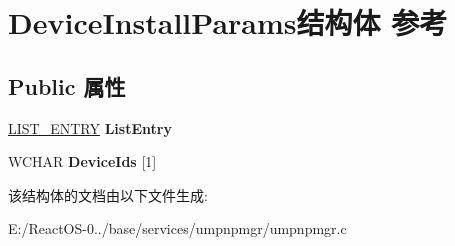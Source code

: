 \hypertarget{struct_device_install_params}{}\section{Device\+Install\+Params结构体 参考}
\label{struct_device_install_params}
\subsection*{Public 属性}
\begin{DoxyCompactItemize}
\item 
\mbox{\label{struct_device_install_params_a2e0cb8e1de7d3b516c00de3889af8368}} 
\hyperlink{struct___l_i_s_t___e_n_t_r_y}{L\+I\+S\+T\+\_\+\+E\+N\+T\+RY} {\bfseries List\+Entry}
\item 
\mbox{\label{struct_device_install_params_a8a22712b20970db35d51d211f3c3bcca}} 
W\+C\+H\+AR {\bfseries Device\+Ids} \mbox{[}1\mbox{]}
\end{DoxyCompactItemize}


该结构体的文档由以下文件生成\+:\begin{DoxyCompactItemize}
\item 
E\+:/\+React\+O\+S-\/0../base/services/umpnpmgr/umpnpmgr.\+c\end{DoxyCompactItemize}
